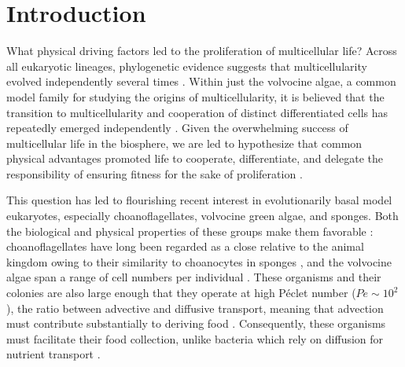 
\chapter{Introduction} %

\ifpdf
    \graphicspath{{Chapter1/Figs/Raster/}{Chapter1/Figs/PDF/}{Chapter1/Figs/}}
\else
    \graphicspath{{Chapter1/Figs/Vector/}{Chapter1/Figs/}}
\fi

What physical driving factors led to the proliferation of multicellular life?
Across all eukaryotic lineages, phylogenetic evidence suggests that multicellularity evolved independently several times \citep{king2004}.
Within just the volvocine algae, a common model family for studying the origins of multicellularity, it is believed that the transition to multicellularity and cooperation of distinct differentiated cells has repeatedly emerged independently \citep{herron2008}.
Given the overwhelming success of multicellular life in the biosphere, we are led to hypothesize that common physical advantages promoted life to cooperate, differentiate, and delegate the responsibility of ensuring fitness for the sake of proliferation \citep{grosberg2007}.

This question has led to flourishing recent interest in evolutionarily basal model eukaryotes, especially choanoflagellates, volvocine green algae, and sponges.
Both the biological and physical properties of these groups make them favorable \citep{goldstein2015}: choanoflagellates have long been regarded as a close relative to the animal kingdom owing to their similarity to choanocytes in sponges \citep{james1871}, and the volvocine algae span a range of cell numbers per individual \citep{kirk2005}.
These organisms and their colonies are also large enough that they operate at high P\'eclet number ($Pe \sim 10^2$), the ratio between advective and diffusive transport, meaning that advection must contribute substantially to deriving food \citep{solari2006}. 
Consequently, these organisms must facilitate their food collection, unlike bacteria which rely on diffusion for nutrient transport \citep{berg1977}.

